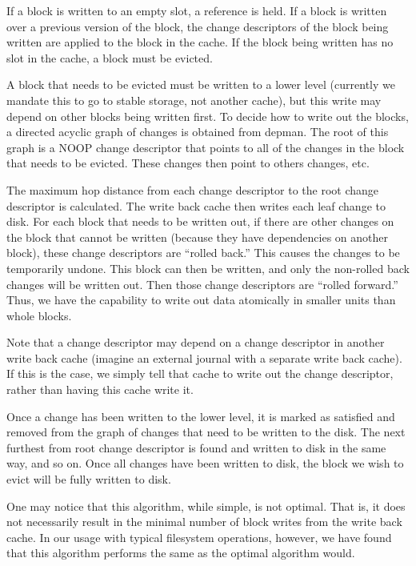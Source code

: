 If a block is written to an empty slot, a reference is held. If a
block is written over a previous version of the block, the change
descriptors of the block being written are applied to the block in the
cache. If the block being written has no slot in the cache, a block
must be evicted.

A block that needs to be evicted must be written to a lower level
(currently we mandate this to go to stable storage, not another
cache), but this write may depend on other blocks being written
first. To decide how to write out the blocks, a directed acyclic graph
of changes is obtained from depman. The root of this graph is a NOOP
change descriptor that points to all of the changes in the block that
needs to be evicted. These changes then point to others changes, etc.

The maximum hop distance from each change descriptor to the root
change descriptor is calculated. The write back cache then writes each
leaf change to disk. For each block that needs to be written out, if
there are other changes on the block that cannot be written (because
they have dependencies on another block), these change descriptors are
``rolled back.'' This causes the changes to be temporarily
undone. This block can then be written, and only the non-rolled back
changes will be written out. Then those change descriptors are
``rolled forward.'' Thus, we have the capability to write out data
atomically in smaller units than whole blocks.

Note that a change descriptor may depend on a change descriptor in
another write back cache (imagine an external journal with a separate
write back cache). If this is the case, we simply tell that cache to
write out the change descriptor, rather than having this cache write
it.

Once a change has been written to the lower level, it is marked as
satisfied and removed from the graph of changes that need to be
written to the disk. The next furthest from root change descriptor is
found and written to disk in the same way, and so on. Once all changes
have been written to disk, the block we wish to evict will be fully
written to disk.

One may notice that this algorithm, while simple, is not optimal. That
is, it does not necessarily result in the minimal number of block
writes from the write back cache. In our usage with typical filesystem
operations, however, we have found that this algorithm performs the
same as the optimal algorithm would.

